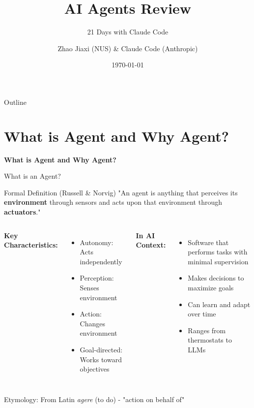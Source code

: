\documentclass[aspectratio=169]{beamer}
\title[AI Agents]{AI Agents Review}
\subtitle{21 Days with Claude Code}
\author[J. Zhao \& CC]{Zhao Jiaxi (NUS) \& Claude Code (Anthropic)}
\date[\today]{\today}
\begin{document}
\begin{frame}
\titlepage
\end{frame}

\begin{frame}{Outline}
\tableofcontents
\end{frame}

\section{What is Agent and Why Agent?}

\begin{frame}
	\begin{center}
		\Large
		\textbf{What is Agent and Why Agent?}
	\end{center}
\end{frame}

\begin{frame}{What is an Agent?}
	\begin{block}{Formal Definition (Russell \& Norvig)}
		"An agent is anything that perceives its \textbf{environment} through sensors and acts upon that environment through \textbf{actuators}."
	\end{block}
	
	\vspace{0.3cm}
	
	\begin{columns}
		\textbf{Key Characteristics:}
		\begin{itemize}
			\item {\color{highlight}Autonomy}: Acts independently
			\item {\color{highlight}Perception}: Senses environment
			\item {\color{highlight}Action}: Changes environment
			\item {\color{highlight}Goal-directed}: Works toward objectives
		\end{itemize}
		
		\textbf{In AI Context:}
		\begin{itemize}
			\item Software that performs tasks with minimal supervision
			\item Makes decisions to maximize goals
			\item Can learn and adapt over time
			\item Ranges from thermostats to LLMs
		\end{itemize}
	\end{columns}
	
	\vspace{0.3cm}
	
	\begin{center}
		\small
		{\color{gray}Etymology: From Latin \textit{agere} (to do) - "action on behalf of"}
	\end{center}
\end{frame}
\end{document}

